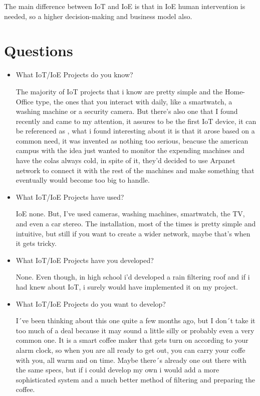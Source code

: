 \documentclass{IEEEtran}
\begin{document}
The main difference between IoT and IoE is that in IoE human intervention is needed, so a higher decision-making and business model also.


\section{Questions }\label{systemModel}
\begin{itemize}
     \item What IoT/IoE Projects do you know?
     
     The majority of IoT projects that i know are pretty simple and the Home-Office type, the ones that 
     you interact with daily, like a smartwatch, a washing machine or a security camera.
     But there's also one that I found recently and came to my attention, it assures to be the first IoT device, it can be referenced as \cite{xu2015animal},
     what i found interesting about it is that it arose based on a common need, it was invented 
     as nothing too serious, beacuse the american campus with the idea just wanted to monitor the expending
     machines and have the colas always cold, in spite of it, they'd decided to use Arpanet network to connect it
     with the rest of the machines and make something that eventually would become too big to handle.

     \item What IoT/IoE Projects have used?
     
     IoE none. But, I've used cameras, washing machines, smartwatch, the TV, and even a car stereo.
     The installation, most of the times is pretty simple and intuitive, but still
     if you want to create a wider network, maybe that's when it gets tricky.

     \item What IoT/IoE Projects have you developed?
     
     None. Even though, in high school i'd developed a rain filtering roof and if i had knew 
     about IoT, i surely would have implemented it on my project.

     \item What IoT/IoE Projects do you want to develop?
     
     I´ve been thinking about this one quite a few months ago, but I don´t take it too much 
     of a deal because it may sound a little silly or probably even a very common one. It is a 
     smart coffee maker that gets turn on according to your alarm clock, so when you are all  
     ready to get out, you can carry your coffe with you, all warm and on time.
     Maybe there´s already one out there with the same specs, but if i could develop my own i would
     add a more sophisticated system and a much better method of filtering and preparing 
     the coffee.

\end{itemize}
\end{document}
